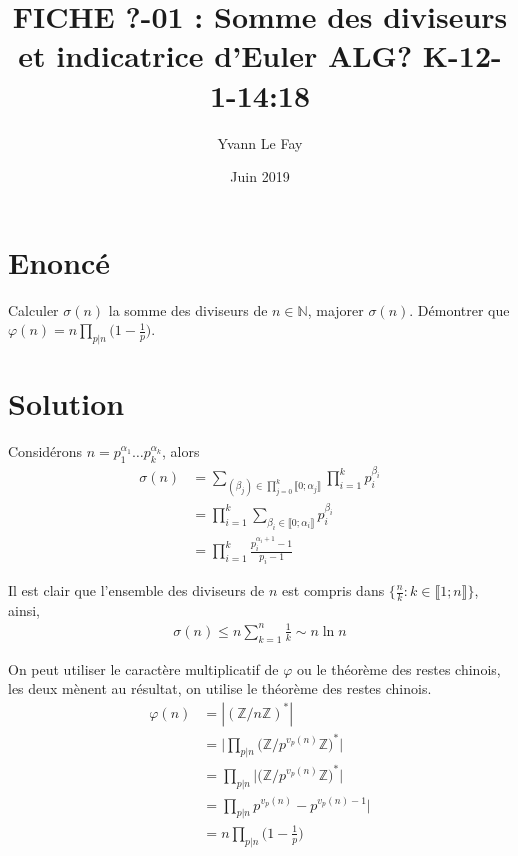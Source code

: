 \documentclass{article}
\begin{document}
\title{FICHE ?-01 : Somme des diviseurs et indicatrice d'Euler ALG? K-12-1-14:18}
\author{Yvann Le Fay}
\date{Juin 2019}
\maketitle

\section*{Enoncé}
Calculer $\sigma(n)$ la somme des diviseurs de $n\in \mathbb{N}$, majorer $\sigma(n)$. Démontrer que $\varphi(n) = n\prod_{p|n}\bigg(1-\frac{1}{p}\bigg)$.
\section*{Solution}
Considérons $n=p_1^{\alpha_1}\ldots p_k^{\alpha_k}$, alors
\begin{align*}
\sigma(n) &= \sum_{(\beta_j)\in \prod_{j=0}^{k}\llbracket 0;\alpha_j\rrbracket}\prod_{i=1}^k p_i^{\beta_i}\\
&=\prod_{i=1}^k \sum_{\beta_i\in\llbracket 0;\alpha_i\rrbracket}{p_i^{\beta_i}}\\
&=\prod_{i=1}^k \frac{p_i^{\alpha_i+1}-1}{p_i-1}
\end{align*}

Il est clair que l'ensemble des diviseurs de $n$ est compris dans $\{\frac{n}{k} : k\in\llbracket 1;n\rrbracket\}$, ainsi, 
\begin{align*}
\sigma(n)\leq n\sum_{k=1}^n \frac{1}{k}\sim n \ln{n}
\end{align*}

On peut utiliser le caractère multiplicatif de $\varphi$ ou le théorème des restes chinois, les deux mènent au résultat, on utilise le théorème des restes chinois. 
\begin{align*}
\varphi(n) &= |(\mathbb{Z}/{n\mathbb{Z}})^*|\\
&= \bigg|\prod_{p|n}\bigg(\mathbb{Z}/{p^{v_p(n)}\mathbb{Z}}\bigg)^*\bigg|\\
&=\prod_{p|n}\bigg|\bigg(\mathbb{Z}/{p^{v_p(n)}\mathbb{Z}}\bigg)^*\bigg|\\
&=\prod_{p|n}p^{v_p(n)}-p^{v_p(n)-1}\bigg|\\
&=n\prod_{p|n}\bigg(1-\frac{1}{p}\bigg)
\end{align*}
\end{document}

